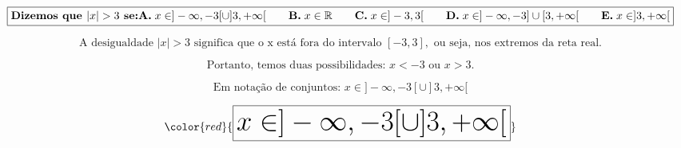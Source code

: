 

\[
\boxed{\textbf{Dizemos que } |x| > 3 \textbf{ se:} \\
\\
\textbf{A.} \; x \in ] -\infty, -3[ \cup ]3, +\infty[ 
\quad\quad
\textbf{B.} \; x \in \mathbb{R} 
\quad\quad
\textbf{C.} \; x \in ] -3, 3[ 
\quad\quad
\textbf{D.} \; x \in ] -\infty, -3] \cup [3, +\infty[ 
\quad\quad
\textbf{E.} \; x \in ]3, +\infty[ }
\]





\[
\text{A desigualdade } |x| > 3 \text{ significa que o x está fora do intervalo } [-3, 3], \text{ ou seja, nos extremos da reta real.}
\]





\[
\text{Portanto, temos duas possibilidades: } x < -3 \text{ ou } x > 3.
\]





\[
\text{Em notação de conjuntos: } x \in ] -\infty, -3[ \cup ]3, +\infty[
\]





\[
\color{red}{\Huge \boxed{x \in ] -\infty, -3[ \cup ]3, +\infty[}}
\]


